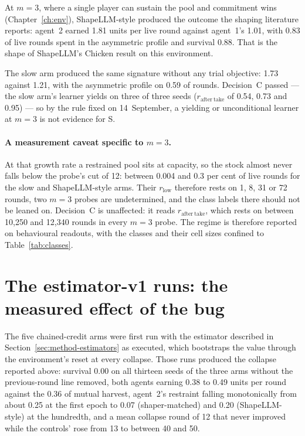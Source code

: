 At \(m=3\), where a single player can sustain the pool and commitment wins
(Chapter~\ref{ch:env}), ShapeLLM-style produced the outcome the shaping
literature reports: agent~2 earned 1.81 units per live round against
agent~1's 1.01, with 0.83 of live rounds spent in the asymmetric profile and
survival 0.88.
That is the shape of ShapeLLM's Chicken result on this environment.

The slow arm produced the same signature without any trial objective: 1.73
against 1.21, with the asymmetric profile on 0.59 of rounds.
Decision~C passed --- the slow arm's learner yields on three of three seeds
(\(r_{\mathrm{after\ take}}\) of 0.54, 0.73 and 0.95) --- so by the rule fixed
on 14~September, a yielding or unconditional learner at \(m=3\) is not
evidence for S.

\paragraph{A measurement caveat specific to \(m=3\).}
At that growth rate a restrained pool sits at capacity, so the stock almost
never falls below the probe's cut of 12: between 0.004 and 0.3 per cent of
live rounds for the slow and ShapeLLM-style arms.
Their \(r_{\mathrm{low}}\) therefore rests on 1, 8, 31 or 72 rounds, two
\(m=3\) probes are undetermined, and the class labels there should not be
leaned on.
Decision~C is unaffected: it reads \(r_{\mathrm{after\ take}}\), which rests
on between 10{,}250 and 12{,}340 rounds in every \(m=3\) probe.
The regime is therefore reported on behavioural readouts, with the classes
and their cell sizes confined to Table~\ref{tab:classes}.

\section{The estimator-v1 runs: the measured effect of the bug}
\label{sec:res-v1}


The five chained-credit arms were first run with the estimator described
in Section~\ref{sec:method-estimators} as executed, which bootstraps the
value through the environment's reset at every collapse.
Those runs produced the collapse reported above: survival 0.00 on all
thirteen seeds of the three arms without the previous-round line removed,
both agents earning 0.38 to 0.49 units per round against the 0.36 of
mutual harvest, agent~2's restraint falling monotonically from about 0.25
at the first epoch to 0.07 (shaper-matched) and 0.20 (ShapeLLM-style) at
the hundredth, and a mean collapse round of 12 that never improved while
the controls' rose from 13 to between 40 and 50.

